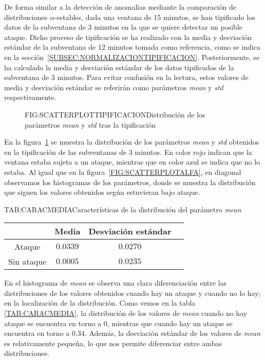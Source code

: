 De forma similar a la detección de anomalías mediante la comparación de distribuciones $\alpha$-estables, dada una ventana de 15 minutos, se han tipificado los datos de la subventana de 3 minutos en la que se quiere detectar un posible ataque. Dicho proceso de tipificación se ha realizado con la media y desviación estándar de la subventana de 12 minutos tomada como referencia, como se indica en la sección~\ref{SUBSEC:NORMALIZACIONTIPIFICACION}. Posteriormente, se ha calculado la media y desviación estándar de los datos tipificados de la subventana de 3 minutos. Para evitar confusión en la lectura, estos valores de media y desviación estándar se referirán como parámetros \textit{mean} y \textit{std} respectivamente.

\begin{figure}[Distribución de los parámetros \textit{mean} y \textit{std} tras la tipificación]{FIG:SCATTERPLOTTIPIFICACION}{Distribución de los parámetros \textit{mean} y \textit{std} tras la tipificación}
    \label{FIG:SCATTERPLOTTIPIFICACION}
\end{figure}

En la figura~\ref{FIG:SCATTERPLOTTIPIFICACION} se muestra la distribución de los parámetros \textit{mean} y \textit{std} obtenidos en la tipificación de las subventanas de 3 minutos. En color rojo indican que la ventana estaba sujeta a un ataque, mientras que en color azul se indica que no lo estaba. 
Al igual que en la figura~\ref{FIG:SCATTERPLOTALFA}, en diagonal observamos los histogramas de los parámetros, donde se muestra la distribución que siguen los valores obtenidos según estuvieran bajo ataque.

\begin{table}[Características de la distribución del parámetro \textit{mean}]{TAB:CARACMEDIA}{Características de la distribución del parámetro \textit{mean}}
    \begin{tabular}{|c|c|c|c|}
        \hline
        & Media & Desviación estándar \\
        \hline
        Ataque & $0.0339$ & $0.0270$ \\
        Sin ataque & $0.0005$ & $0.0235$ \\
        \hline
    \end{tabular}
\end{table}

En el histograma de \textit{mean} se observa una clara diferenciación entre las distribuciones de los valores obtenidos cuando hay un ataque y cuando no lo hay; en la localización de la distribución.
Como vemos en la tabla \ref{TAB:CARACMEDIA}, la distribución de los valores de \textit{mean} cuando no hay ataque se encuentra en torno a $0$, mientras que cuando hay un ataque se encuentra en torno a $0.34$. Además, la desviación estándar de los valores de \textit{mean} es relativamente pequeña, lo que nos permite diferenciar entre ambas distribuciones.


